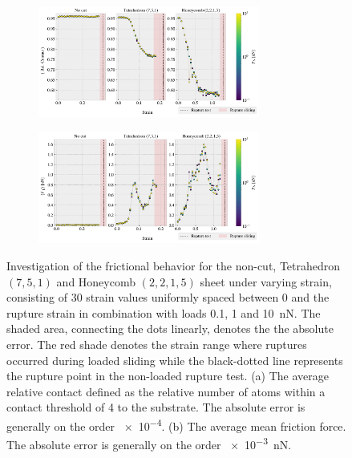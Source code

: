 \begin{figure}[!htb]
  \centering
  \begin{subfigure}[t]{\textwidth}
      \centering
      \includegraphics[width=0.8\textwidth]{figures/baseline/multi_stretch_area_compare.pdf}
      \caption{}
      \label{fig:multi_stretch_contact}
  \end{subfigure}
  \hfill
  \begin{subfigure}[t]{\textwidth}
      \centering
      \includegraphics[width=0.8\textwidth]{figures/baseline/multi_stretch_mean_compare.pdf}
      \caption{}
      \label{fig:multi_stretch_mean_fric}
  \end{subfigure}
  \hfill
     \caption{Investigation of the frictional behavior for the non-cut, Tetrahedron $(7,5,1)$ and Honeycomb $(2,2,1,5)$ sheet under varying strain, consisting of 30 strain values uniformly spaced between 0 and the rupture strain in combination with loads 0.1, 1 and
     \SI{10}{nN}. The shaded area, connecting the dots linearly, denotes the
     the absolute error. The red shade denotes the strain range where ruptures
     occurred during loaded sliding while the black-dotted line represents the rupture
     point in the non-loaded rupture test. (a) The average relative contact
     defined as the relative number of atoms within a contact threshold of
     \SI{4}{} to the substrate. The absolute error is generally on the
     order \num{e-4}. (b) The average mean friction force. The absolute error is generally on the order \SI{e-3}{nN}.}
     \label{fig:multi_stretch}
\end{figure}


